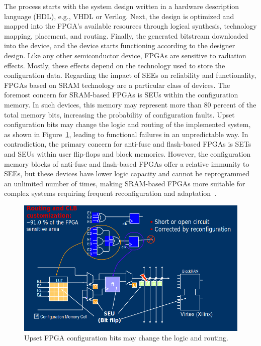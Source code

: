 The process starts with the system design written
in a hardware description language (HDL), e.g., VHDL or Verilog. Next, the design is optimized and mapped into the FPGA’s available resources through logical synthesis,
technology mapping, placement, and routing. Finally, the generated bitstream downloaded into the device, and the device starts functioning according to the designer design.
Like any other semiconductor device, FPGAs are sensitive to radiation effects.
Mostly, these effects depend on the technology used to store the configuration data.
Regarding the impact of SEEs on reliability and functionality, FPGAs based on SRAM
technology are a particular class of devices. The foremost concern for SRAM-based FPGAs is
SEUs within the configuration memory. In such devices, this memory may represent more
than 80 percent of the total memory bits, increasing the probability of configuration faults.
Upset configuration bits may change the logic and routing of the implemented system, as
shown in Figure~\ref{fig:seu}, leading to functional failures in an unpredictable way. In contradiction, the primary concern for anti-fuse and flash-based FPGAs is SETs and SEUs within user flip-flops
and block memories. However, the configuration memory blocks of anti-fuse and flash-based
FPGAs offer a relative immunity to SEEs, but these devices have lower logic capacity and
cannot be reprogrammed an unlimited number of times, making SRAM-based FPGAs more
suitable for complex systems requiring frequent reconfiguration and adaptation~\cite{quinn2015validation, violante2004simulation}.

\begin{figure}
 \centering
  \captionsetup{justification=centering}    
   \includegraphics[scale=0.4]{figures/img/seu.png}
   \caption{Upset FPGA configuration bits may change the logic and routing.}
\label{fig:seu}
\end{figure}


